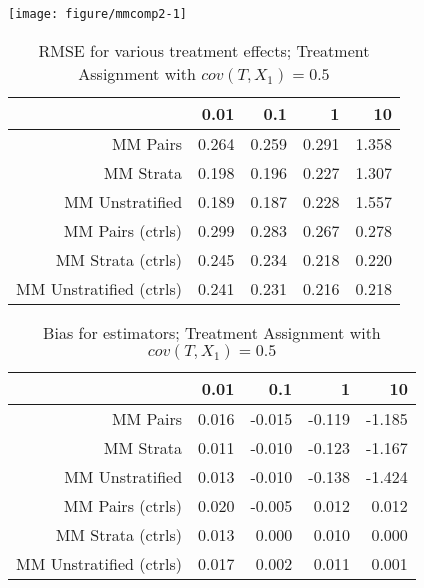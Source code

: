 \documentclass[11pt]{article}\usepackage[]{graphicx}\usepackage[]{color}
\makeatletter
\def\maxwidth{ %
  \ifdim\Gin@nat@width>\linewidth
    \linewidth
  \else
    \Gin@nat@width
  \fi
}
\newenvironment{knitrout}{}{} %
\makeatother
\begin{document}
\begin{knitrout}
\color{fgcolor}

{\centering \texttt{[image: figure/mmcomp2-1]} 

}



\end{knitrout}

\begin{table}[ht]
\centering
\begin{tabular}{rrrrr}
  \hline
 & 0.01 & 0.1 & 1 & 10 \\ 
  \hline
MM Pairs & 0.264 & 0.259 & 0.291 & 1.358 \\ 
  MM Strata & 0.198 & 0.196 & 0.227 & 1.307 \\ 
  MM Unstratified & 0.189 & 0.187 & 0.228 & 1.557 \\ 
  MM Pairs (ctrls) & 0.299 & 0.283 & 0.267 & 0.278 \\ 
  MM Strata (ctrls) & 0.245 & 0.234 & 0.218 & 0.220 \\ 
  MM Unstratified (ctrls) & 0.241 & 0.231 & 0.216 & 0.218 \\ 
   \hline
\end{tabular}
\caption{RMSE for various treatment effects; Treatment Assignment with $cov(T, X_1) = 0.5$} 
\label{tab:mmcomp2}
\end{table}
\begin{table}[ht]
\centering
\begin{tabular}{rrrrr}
  \hline
 & 0.01 & 0.1 & 1 & 10 \\ 
  \hline
MM Pairs & 0.016 & -0.015 & -0.119 & -1.185 \\ 
  MM Strata & 0.011 & -0.010 & -0.123 & -1.167 \\ 
  MM Unstratified & 0.013 & -0.010 & -0.138 & -1.424 \\ 
  MM Pairs (ctrls) & 0.020 & -0.005 & 0.012 & 0.012 \\ 
  MM Strata (ctrls) & 0.013 & 0.000 & 0.010 & 0.000 \\ 
  MM Unstratified (ctrls) & 0.017 & 0.002 & 0.011 & 0.001 \\ 
   \hline
\end{tabular}
\caption{Bias for estimators; Treatment Assignment with $cov(T, X_1) = 0.5$} 
\label{tab:mmcomp2}
\end{table}
\end{document}

